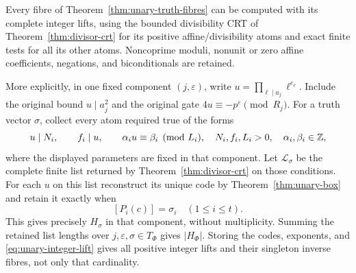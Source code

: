 \begin{proposition}
\label{prop:unary-crt-fibre}
Every fibre of Theorem~\ref{thm:unary-truth-fibres} can be
computed with its complete integer lifts, using the bounded
divisibility CRT of Theorem~\ref{thm:divisor-crt} for its
positive affine/divisibility atoms and exact finite tests for
all its other atoms.  Noncoprime moduli, nonunit or zero
affine coefficients, negations, and biconditionals are retained.

More explicitly, in one fixed component \((j,\varepsilon)\),
write \(u=\prod_{\ell\mid a_j}\ell^{e_\ell}\).
Include the original bound \(u\mid a_j^2\) and the original
gate \(4u\equiv-p^\varepsilon\pmod{R_j}\).
For a truth vector \(\sigma\), collect every atom required true
of the forms
\[
 u\mid N_i,\qquad f_i\mid u,\qquad
 \alpha_i u\equiv\beta_i\pmod{L_i},
 \quad N_i,f_i,L_i>0,\quad\alpha_i,\beta_i\in\mathbb Z,
\]
where the displayed parameters are fixed in that component.
Let \(\mathcal L_\sigma\) be the complete finite list returned
by Theorem~\ref{thm:divisor-crt} on those conditions.
For each \(u\) on this list reconstruct its unique code by
Theorem~\ref{thm:unary-box} and retain it exactly when
\[
 [P_i(c)]=\sigma_i\quad(1\le i\le t).
\]
This gives precisely \(H_\sigma\) in that component, without
multiplicity.  Summing the retained list lengths over
\(j,\varepsilon,\sigma\in T_\Phi\) gives \(|H_\Phi|\).
Storing the codes, exponents, and \eqref{eq:unary-integer-lift}
gives all positive integer lifts and their singleton inverse
fibres, not only that cardinality.
\end{proposition}

